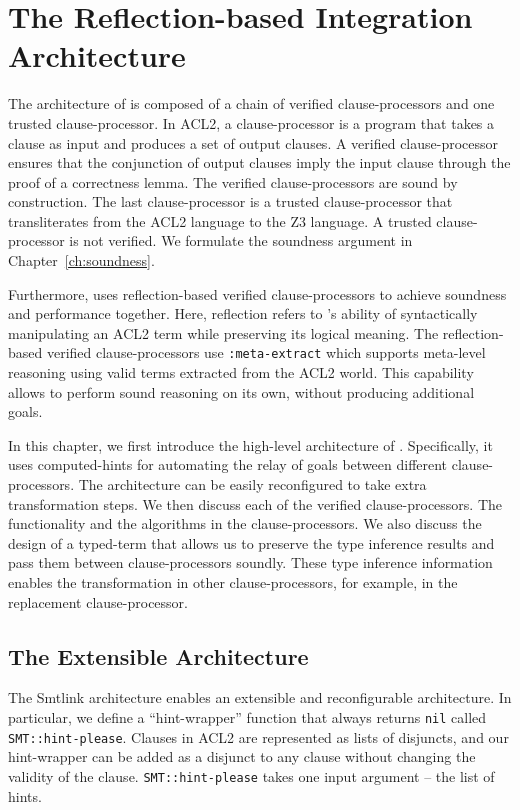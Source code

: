 \chapter{The Reflection-based Integration Architecture}
\label{ch:arch}

The architecture of \smtlink{} is composed of a chain of verified
clause-processors and one trusted clause-processor.
In ACL2, a clause-processor is a program that takes a clause as input and
produces a set of output clauses.
A verified clause-processor ensures that the conjunction of output clauses imply
the input clause through the proof of a correctness lemma.
The verified clause-processors are sound by construction. The last
clause-processor is a trusted clause-processor that transliterates from the ACL2
language to the Z3 language. A trusted clause-processor is not verified. We
formulate the soundness argument in Chapter~\ref{ch:soundness}.

Furthermore, \smtlink{} uses reflection-based verified clause-processors to
achieve soundness and performance together.
Here, reflection refers to \smtlink{}'s ability of syntactically manipulating
an ACL2 term while preserving its logical meaning.
The reflection-based verified clause-processors use \texttt{:meta-extract} which
supports meta-level reasoning using valid terms extracted from the ACL2 world.
This capability allows \smtlink{} to perform sound reasoning on its own, without
producing additional goals.

In this chapter, we first introduce the high-level architecture of \smtlink{}.
Specifically, it uses computed-hints for automating the relay of goals between
different clause-processors.
The architecture can be easily reconfigured to take extra transformation steps.
We then discuss each of the verified clause-processors. The functionality and
the algorithms in the clause-processors.
We also discuss the design of a typed-term that allows us to preserve the type
inference results and pass them between clause-processors soundly.
These type inference information enables the transformation in other
clause-processors, for example, in the replacement clause-processor.

\section{The Extensible Architecture}
The Smtlink architecture enables an extensible and reconfigurable architecture.
In particular, we define a ``hint-wrapper''\cite{hint-wrapper} function that
always returns \texttt{nil} called \texttt{SMT::hint-please}.
Clauses in ACL2 are represented as lists of disjuncts, and our hint-wrapper can
be added as a disjunct to any clause without changing the validity of the
clause.
\texttt{SMT::hint-please} takes one input argument -- the list of hints.


